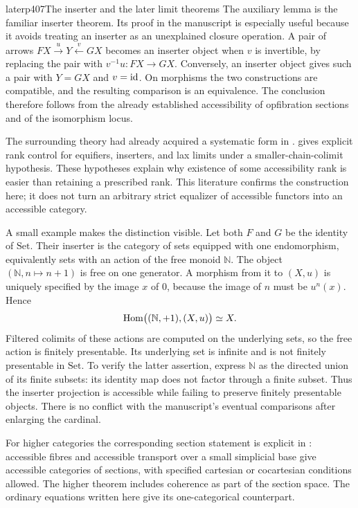 \begin{dcomment}{later}{p407}{The inserter and the later limit theorems}
The auxiliary lemma is the familiar inserter theorem. Its proof in the manuscript is especially useful because it avoids treating an inserter as an unexplained closure operation. A pair of arrows $FX\xrightarrow{u}Y\xleftarrow{v}GX$ becomes an inserter object when $v$ is invertible, by replacing the pair with $v^{-1}u:FX\to GX$. Conversely, an inserter object gives such a pair with $Y=GX$ and $v=\mathrm{id}$. On morphisms the two constructions are compatible, and the resulting comparison is an equivalence. The conclusion therefore follows from the already established accessibility of opfibration sections and of the isomorphism locus.

The surrounding theory had already acquired a systematic form in \citet[\S5.1]{MakkaiPare1989}. \citet[Theorems 3.1, 4.1, and 8.1--8.3]{Positselski2024Limits} gives explicit rank control for equifiers, inserters, and lax limits under a smaller-chain-colimit hypothesis. These hypotheses explain why existence of some accessibility rank is easier than retaining a prescribed rank. This literature confirms the construction here; it does not turn an arbitrary strict equalizer of accessible functors into an accessible category.

A small example makes the distinction visible. Let both $F$ and $G$ be the identity of $\mathrm{Set}$. Their inserter is the category of sets equipped with one endomorphism, equivalently sets with an action of the free monoid $\mathbb N$. The object $(\mathbb N,n\mapsto n+1)$ is free on one generator. A morphism from it to $(X,u)$ is uniquely specified by the image $x$ of $0$, because the image of $n$ must be $u^n(x)$. Hence
\[
 \operatorname{Hom}\bigl((\mathbb N,+1),(X,u)\bigr)\simeq X.
\]
Filtered colimits of these actions are computed on the underlying sets, so the free action is finitely presentable. Its underlying set is infinite and is not finitely presentable in $\mathrm{Set}$. To verify the latter assertion, express $\mathbb N$ as the directed union of its finite subsets: its identity map does not factor through a finite subset. Thus the inserter projection is accessible while failing to preserve finitely presentable objects. There is no conflict with the manuscript's eventual comparisons after enlarging the cardinal.

For higher categories the corresponding section statement is explicit in \citet[Proposition 5.4.7.11 and Remarks 5.4.7.13--14]{Lurie2009HTT}: accessible fibres and accessible transport over a small simplicial base give accessible categories of sections, with specified cartesian or cocartesian conditions allowed. The higher theorem includes coherence as part of the section space. The ordinary equations written here give its one-categorical counterpart.
\end{dcomment}


